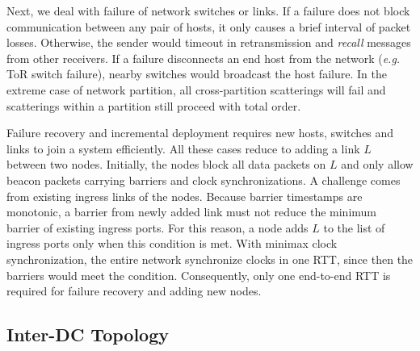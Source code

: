 Next, we deal with failure of network switches or links.
If a failure does not block communication between any pair of hosts, it only causes a brief interval of packet losses.
Otherwise, the sender would timeout in retransmission and \textit{recall} messages from other receivers.
If a failure disconnects an end host from the network (\textit{e.g.} ToR switch failure), nearby switches would broadcast the host failure.
In the extreme case of network partition, all cross-partition scatterings will fail and scatterings within a partition still proceed with total order.



Failure recovery and incremental deployment requires new hosts, switches and links to join a \sys system efficiently.
All these cases reduce to adding a link $L$ between two nodes.
Initially, the nodes block all data packets on $L$ and only allow beacon packets carrying barriers and clock synchronizations.
A challenge comes from existing ingress links of the nodes.
Because barrier timestamps are monotonic, a barrier from newly added link must not reduce the minimum barrier of existing ingress ports.
For this reason, a node adds $L$ to the list of ingress ports only when this condition is met.
With minimax clock synchronization, the entire network synchronize clocks in one RTT, since then the barriers would meet the condition.
Consequently, only one end-to-end RTT is required for failure recovery and adding new nodes.

\iffalse
\subsection{Inter-DC Topology}
\label{sec:inter-dc}


